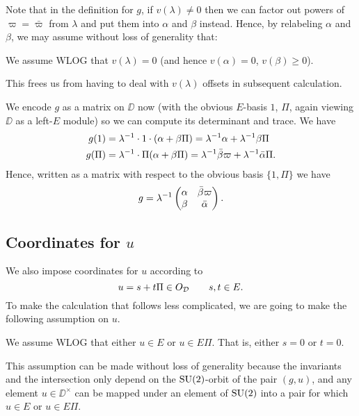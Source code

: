 Note that in the definition for $g$, if $v(\lambda) \neq 0$
then we can factor out powers of $\varpi = \bar\varpi$ from $\lambda$
and put them into $\alpha$ and $\beta$ instead.
Hence, by relabeling $\alpha$ and $\beta$, we may assume without loss of generality that:
\begin{assume}
  We assume WLOG that $v(\lambda) = 0$ (and hence $v(\alpha)=0$, $v(\beta) \ge 0$).
\end{assume}
This frees us from having to deal with $v(\lambda)$ offsets in subsequent calculation.

We encode $g$ as a matrix on $\DD$ now (with the obvious $E$-basis $1$, $\Pi$,
again viewing $\DD$ as a left-$E$ module)
so we can compute its determinant and trace.
We have
\begin{align*}
  g(1) &= \lambda^{-1} \cdot 1 \cdot (\alpha + \beta \Pi)
    = \lambda^{-1} \alpha + \lambda^{-1} \beta \Pi \\
  g(\Pi) &= \lambda^{-1} \cdot \Pi (\alpha + \beta \Pi)
    = \lambda^{-1} \bar\beta \varpi + \lambda^{-1} \bar\alpha \Pi.
\end{align*}
Hence, written as a matrix with respect to the obvious basis $\{1, \Pi\}$ we have
\[ g = \lambda^{-1} \begin{pmatrix}
  \alpha & \bar\beta \varpi \\
  \beta &  \bar\alpha
  \end{pmatrix}. \]

\subsection{Coordinates for $u$}
We also impose coordinates for $u$ according to
\[ u = s + t \Pi \in O_\mathcal D \qquad s, t \in E. \]
To make the calculation that follows less complicated,
we are going to make the following assumption on $u$.
\begin{assume}
  We assume WLOG that either $u \in E$ or $u \in E \Pi$.
  That is, either $s = 0$ or $t = 0$.
  \label{assume:st_zero}
\end{assume}
This assumption can be made without loss of generality because
the invariants and the intersection only depend
on the $\operatorname{SU}(2)$-orbit of the pair $(g,u)$,
and any element $u \in \DD^\times$ can be mapped under an element of $\operatorname{SU}(2)$
into a pair for which $u \in E$ or $u \in E \Pi$.

